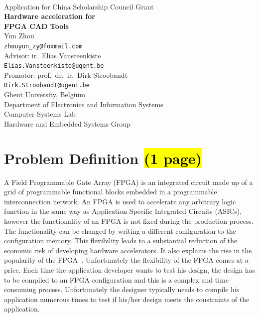 \documentclass[a4paper,oneside,12pt]{article}
\begin{document}

\thispagestyle{empty}

\begin{center}
\mbox{}\\\vspace{5mm}
{\Large Application for China Scholarship Council Grant}\\ [45mm]
%
{\bf\Huge Hardware acceleration for\\
[3mm] FPGA CAD Tools} \\
\vspace{45mm}
\Large Yun Zhou \\
\vspace{2mm}
\small\texttt{zhouyun\_zy@foxmail.com} \\
\vspace{20mm}
\Large Advisor: ir.\ Elias Vansteenkiste \\
\small\texttt{Elias.Vansteenkiste@ugent.be} \\
\vspace{2mm}
\Large Promotor: prof.\ dr.\ ir.\ Dirk Stroobandt \\
\small\texttt{Dirk.Stroobandt@ugent.be} \\
\vspace{20mm}
\normalsize Ghent University, Belgium \\
\normalsize Department of Electronics and Information Systems\\
\normalsize Computer Systems Lab\\
\normalsize Hardware and Embedded Systems Group 
\end{center}

\newpage

\tableofcontents

\clearpage

\section{Problem Definition \hl{(1 page)}}
A Field Programmable Gate Array (FPGA) is an integrated circuit made up of a grid of programmable functional blocks embedded in a programmable interconnection network. An FPGA is used to accelerate any arbitrary logic function in the same way as Application Specific Integrated Circuits (ASICs), however the functionality of an FPGA is not fixed during the production process. The functionality can be changed by writing a different configuration to the configuration memory. This flexibility leads to a substantial reduction of the economic risk of developing hardware accelerators. It also explains the rise in the popularity of the FPGA~\cite{putnam2015reconfigurable}. Unfortunately the flexibility of the FPGA comes at a price.  Each time the application developer wants to test his design, the design has to be compiled to an FPGA configuration and this is a complex and time consuming process. Unfortunately the designer typically needs to compile his application numerous times to test if his/her design meets the constraints of the application. 
\end{document}
